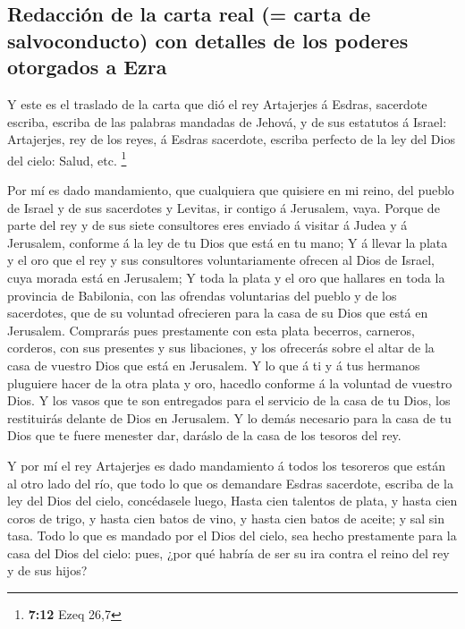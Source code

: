 \hypertarget{redacciuxf3n-de-la-carta-real-carta-de-salvoconducto-con-detalles-de-los-poderes-otorgados-a-ezra}{%
\subsection{Redacción de la carta real (= carta de salvoconducto) con
detalles de los poderes otorgados a
Ezra}\label{redacciuxf3n-de-la-carta-real-carta-de-salvoconducto-con-detalles-de-los-poderes-otorgados-a-ezra}}

 Y este es el traslado de la carta que dió el rey
Artajerjes á Esdras, sacerdote escriba, escriba de las palabras mandadas
de Jehová, y de sus estatutos á Israel:  Artajerjes, rey
de los reyes, á Esdras sacerdote, escriba perfecto de la ley del Dios
del cielo: Salud, etc. \footnote{\textbf{7:12} Ezeq 26,7}

 Por mí es dado mandamiento, que cualquiera que quisiere
en mi reino, del pueblo de Israel y de sus sacerdotes y Levitas, ir
contigo á Jerusalem, vaya.  Porque de parte del rey y de
sus siete consultores eres enviado á visitar á Judea y á Jerusalem,
conforme á la ley de tu Dios que está en tu mano;  Y á
llevar la plata y el oro que el rey y sus consultores voluntariamente
ofrecen al Dios de Israel, cuya morada está en Jerusalem;
 Y toda la plata y el oro que hallares en toda la
provincia de Babilonia, con las ofrendas voluntarias del pueblo y de los
sacerdotes, que de su voluntad ofrecieren para la casa de su Dios que
está en Jerusalem.  Comprarás pues prestamente con esta
plata becerros, carneros, corderos, con sus presentes y sus libaciones,
y los ofrecerás sobre el altar de la casa de vuestro Dios que está en
Jerusalem.  Y lo que á ti y á tus hermanos pluguiere
hacer de la otra plata y oro, hacedlo conforme á la voluntad de vuestro
Dios.  Y los vasos que te son entregados para el servicio
de la casa de tu Dios, los restituirás delante de Dios en Jerusalem.
 Y lo demás necesario para la casa de tu Dios que te
fuere menester dar, daráslo de la casa de los tesoros del rey.

 Y por mí el rey Artajerjes es dado mandamiento á todos
los tesoreros que están al otro lado del río, que todo lo que os
demandare Esdras sacerdote, escriba de la ley del Dios del cielo,
concédasele luego,  Hasta cien talentos de plata, y hasta
cien coros de trigo, y hasta cien batos de vino, y hasta cien batos de
aceite; y sal sin tasa.  Todo lo que es mandado por el
Dios del cielo, sea hecho prestamente para la casa del Dios del cielo:
pues, ¿por qué habría de ser su ira contra el reino del rey y de sus
hijos?


